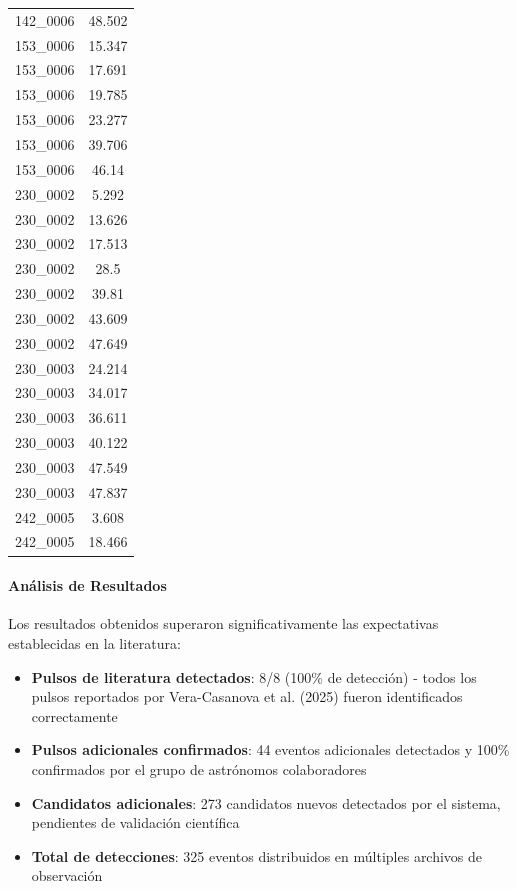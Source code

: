 \begin{table}[H]
\begin{tabular}{|c|c|}
        142\_0006 & 48.502 \\
        153\_0006 & 15.347 \\
        153\_0006 & 17.691 \\
        153\_0006 & 19.785 \\
        153\_0006 & 23.277 \\
        153\_0006 & 39.706 \\
        153\_0006 & 46.14 \\
        230\_0002 & 5.292 \\
        230\_0002 & 13.626 \\
        230\_0002 & 17.513 \\
        230\_0002 & 28.5 \\
        230\_0002 & 39.81 \\
        230\_0002 & 43.609 \\
        230\_0002 & 47.649 \\
        230\_0003 & 24.214 \\
        230\_0003 & 34.017 \\
        230\_0003 & 36.611 \\
        230\_0003 & 40.122 \\
        230\_0003 & 47.549 \\
        230\_0003 & 47.837 \\
        242\_0005 & 3.608 \\
        242\_0005 & 18.466 \\
        \hline
    \end{tabular}
\end{table}

\paragraph{Análisis de Resultados}

Los resultados obtenidos superaron significativamente las expectativas establecidas en la literatura:

\begin{itemize}
    \item \textbf{Pulsos de literatura detectados}: 8/8 (100\% de detección) - todos los pulsos reportados por Vera-Casanova et al. (2025) fueron identificados correctamente
    \item \textbf{Pulsos adicionales confirmados}: 44 eventos adicionales detectados y 100\% confirmados por el grupo de astrónomos colaboradores
    \item \textbf{Candidatos adicionales}: 273 candidatos nuevos detectados por el sistema, pendientes de validación científica
    \item \textbf{Total de detecciones}: 325 eventos distribuidos en múltiples archivos de observación
\end{itemize}


